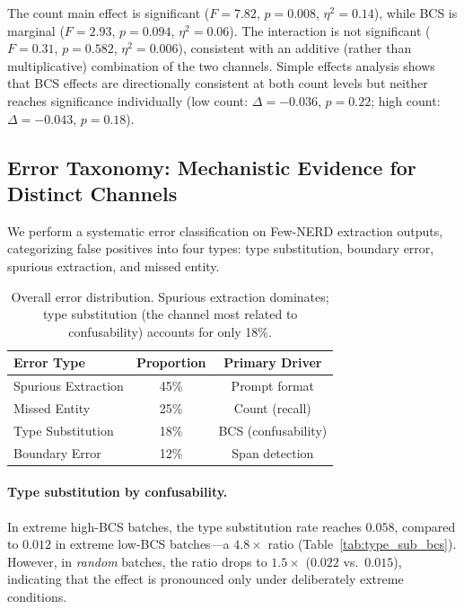\documentclass[11pt,a4paper]{article}
\begin{document}
The count main effect is significant ($F{=}7.82$, $p{=}0.008$, $\eta^2{=}0.14$), while BCS is marginal ($F{=}2.93$, $p{=}0.094$, $\eta^2{=}0.06$).
The interaction is not significant ($F{=}0.31$, $p{=}0.582$, $\eta^2{=}0.006$), consistent with an additive (rather than multiplicative) combination of the two channels.
Simple effects analysis shows that BCS effects are directionally consistent at both count levels but neither reaches significance individually (low count: $\Delta{=}{-}0.036$, $p{=}0.22$; high count: $\Delta{=}{-}0.043$, $p{=}0.18$).


\subsection{Error Taxonomy: Mechanistic Evidence for Distinct Channels}
\label{sec:error_taxonomy}

We perform a systematic error classification on Few-NERD extraction outputs, categorizing false positives into four types: type substitution, boundary error, spurious extraction, and missed entity.

\begin{table}[t]
\centering
\caption{Overall error distribution. Spurious extraction dominates; type substitution (the channel most related to confusability) accounts for only 18\%.}
\label{tab:error_dist}
\small
\begin{tabular}{lcc}
\toprule
\textbf{Error Type} & \textbf{Proportion} & \textbf{Primary Driver} \\
\midrule
Spurious Extraction & 45\% & Prompt format \\
Missed Entity       & 25\% & Count (recall) \\
Type Substitution   & 18\% & BCS (confusability) \\
Boundary Error      & 12\% & Span detection \\
\bottomrule
\end{tabular}
\end{table}

\paragraph{Type substitution by confusability.}
In extreme high-BCS batches, the type substitution rate reaches $0.058$, compared to $0.012$ in extreme low-BCS batches---a $4.8{\times}$ ratio (Table~\ref{tab:type_sub_bcs}).
However, in \emph{random} batches, the ratio drops to $1.5{\times}$ ($0.022$ vs.\ $0.015$), indicating that the effect is pronounced only under deliberately extreme conditions.
\end{document}
